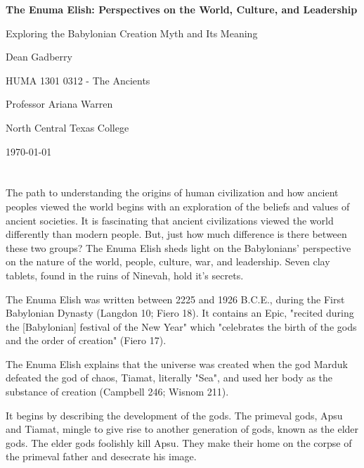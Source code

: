 \documentclass[12pt,a4paper,english]{article}
\begin{document}
\begin{titlepage}
  \begin{center}
    \vspace*{\fill}
    \textbf{The Enuma Elish: Perspectives on the World, Culture, and Leadership}
    \par
    Exploring the Babylonian Creation Myth and Its Meaning
    \par
    Dean Gadberry
    \vspace*{\fill}
    \hfill

       HUMA 1301 0312 - The Ancients 
       \par
       Professor Ariana Warren
       \par
       North Central Texas College
       \par
       \today
  \end{center}
\end{titlepage}
\newpage
{} %
\sloppy

\section*{}
The path to understanding the origins of human civilization and how ancient peoples viewed the world begins with an exploration of the beliefs and values of ancient societies. 
It is fascinating that ancient civilizations viewed the world differently than modern people. But, just how much difference is there between these two groups?
The Enuma Elish sheds light on the Babylonians' perspective on the nature of the world, people, culture, war, and leadership.
Seven clay tablets, found in the ruins of Ninevah, hold it's secrets.

The Enuma Elish was written between 2225 and 1926 B.C.E., during the First Babylonian Dynasty (Langdon 10; Fiero 18). 
It contains an Epic, "recited during the [Babylonian] festival of the New Year" which "celebrates the birth of the gods and the order of creation" (Fiero 17).

The Enuma Elish explains that the universe was created when the god Marduk defeated the god of chaos, Tiamat, literally "Sea", and used her body as the substance of creation (Campbell 246; Wisnom 211). 

It begins by describing the development of the gods. 
The primeval gods, Apsu and Tiamat, mingle to give rise to another generation of gods, known as the elder gods. 
The elder gods foolishly kill Apsu. 
They make their home on the corpse of the primeval father and desecrate his image. 
\end{document}
